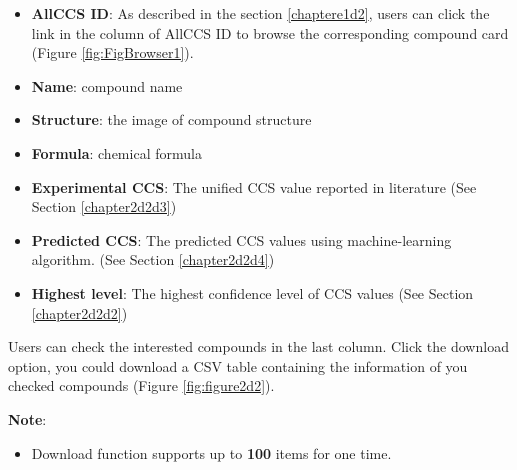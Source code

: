 \documentclass[12pt,]{book}
\providecommand{\tightlist}{%
  \setlength{\itemsep}{0pt}\setlength{\parskip}{0pt}}
\begin{document}
\begin{itemize}
\tightlist
\item
  \textbf{AllCCS ID}: As described in the section \ref{chaptere1d2},
  users can click the link in the column of AllCCS ID to browse the
  corresponding compound card (Figure \ref{fig:FigBrowser1}).
\item
  \textbf{Name}: compound name
\item
  \textbf{Structure}: the image of compound structure
\item
  \textbf{Formula}: chemical formula
\item
  \textbf{Experimental CCS}: The unified CCS value reported in
  literature (See Section \ref{chapter2d2d3})
\item
  \textbf{Predicted CCS}: The predicted CCS values using
  machine-learning algorithm. (See Section \ref{chapter2d2d4})
\item
  \textbf{Highest level}: The highest confidence level of CCS values
  (See Section \ref{chapter2d2d2})
\end{itemize}

Users can check the interested compounds in the last column. Click the
download option, you could download a CSV table containing the
information of you checked compounds (Figure \ref{fig:figure2d2}).

\textbf{Note}:

\begin{itemize}
\tightlist
\item
  Download function supports up to \textbf{100} items for one time.
\end{itemize}
\end{document}
